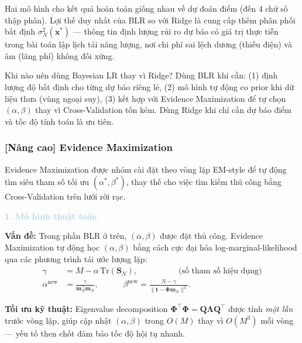 Hai mô hình cho kết quả hoàn toàn giống nhau về dự đoán điểm (đến 4
chữ số thập phân). Lợi thế duy nhất của BLR so với Ridge là cung cấp
thêm phân phối bất định $\sigma_N^2(\mathbf{x}^*)$ --- thông tin định
lượng rủi ro dự báo có giá trị thực tiễn trong bài toán lập lịch tải
năng lượng, nơi chi phí sai lệch dương (thiếu điện) và âm (lãng phí)
không đối xứng.

\begin{notebox}{Khi nào nên dùng Bayesian LR thay vì Ridge?}
Dùng BLR khi cần: (1) định lượng độ bất định cho từng dự báo riêng lẻ,
(2) mô hình tự động co prior khi dữ liệu thưa (vùng ngoại suy),
(3) kết hợp với Evidence Maximization để tự chọn $(\alpha, \beta)$ thay
vì Cross-Validation tốn kém. Dùng Ridge khi chỉ cần dự báo điểm và tốc
độ tính toán là ưu tiên.
\end{notebox}


\subsubsection{[Nâng cao] Evidence Maximization}

Evidence Maximization được nhóm cài đặt theo vòng lặp EM-style để tự động tìm siêu tham số tối ưu $(\alpha^*, \beta^*)$, thay thế cho việc tìm kiếm thủ công bằng Cross-Validation trên lưới rời rạc.

\vspace{0.5em}
\noindent\textcolor{lightblue}{\textbf{1. Mô hình thuật toán}}
\vspace{0.5em}

\textbf{Vấn đề:} Trong phần BLR ở trên, $(\alpha, \beta)$ được đặt thủ công.
Evidence Maximization tự động học
$(\alpha, \beta)$ bằng cách cực đại hóa log-marginal-likelihood qua các
phương trình tái ước lượng lặp:
\begin{align*}
  \gamma &= M - \alpha\,\mathrm{Tr}(\mathbf{S}_N), \qquad\qquad\quad
             \text{(số tham số hiệu dụng)} \\
  \alpha^{\mathrm{new}} &= \frac{\gamma}{\mathbf{m}_N^\top\mathbf{m}_N}, \qquad\quad
  \beta^{\mathrm{new}}  = \frac{N - \gamma}{\|\boldsymbol{t} - \boldsymbol{\Phi}\mathbf{m}_N\|^2}.
\end{align*}

\textbf{Tối ưu kỹ thuật:} Eigenvalue decomposition
$\boldsymbol{\Phi}^\top\boldsymbol{\Phi} = \mathbf{Q}\boldsymbol{\Lambda}\mathbf{Q}^\top$
được tính \textit{một lần} trước vòng lặp, giúp cập nhật $(\alpha, \beta)$
trong $O(M)$ thay vì $O(M^3)$ mỗi vòng --- yếu tố then chốt đảm bảo tốc độ hội tụ nhanh.

